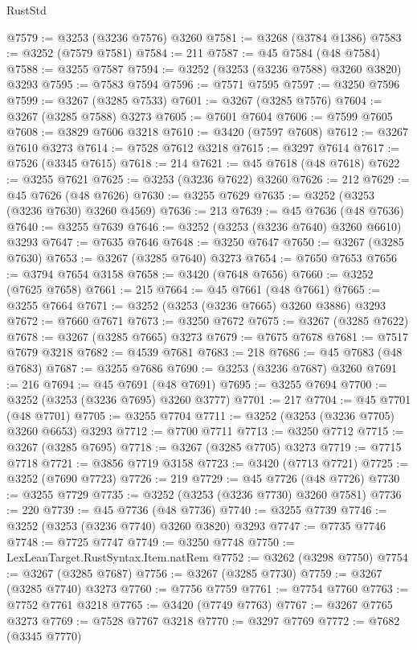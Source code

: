 \begin{lexlean}{RustStd}
\begin{coremodule}
@7579 := @3253 (@3236 @7576) @3260
@7581 := @3268 (@3784 @1386)
@7583 := @3252 (@7579 @7581)
@7584 := 211
@7587 := @45 @7584 (@48 @7584)
@7588 := @3255 @7587
@7594 := @3252 (@3253 (@3236 @7588) @3260 @3820) @3293
@7595 := @7583 @7594
@7596 := @7571 @7595
@7597 := @3250 @7596
@7599 := @3267 (@3285 @7533)
@7601 := @3267 (@3285 @7576)
@7604 := @3267 (@3285 @7588) @3273
@7605 := @7601 @7604
@7606 := @7599 @7605
@7608 := @3829 @7606 @3218
@7610 := @3420 (@7597 @7608)
@7612 := @3267 @7610 @3273
@7614 := @7528 @7612 @3218
@7615 := @3297 @7614
@7617 := @7526 (@3345 @7615)
@7618 := 214
@7621 := @45 @7618 (@48 @7618)
@7622 := @3255 @7621
@7625 := @3253 (@3236 @7622) @3260
@7626 := 212
@7629 := @45 @7626 (@48 @7626)
@7630 := @3255 @7629
@7635 := @3252 (@3253 (@3236 @7630) @3260 @4569)
@7636 := 213
@7639 := @45 @7636 (@48 @7636)
@7640 := @3255 @7639
@7646 := @3252 (@3253 (@3236 @7640) @3260 @6610) @3293
@7647 := @7635 @7646
@7648 := @3250 @7647
@7650 := @3267 (@3285 @7630)
@7653 := @3267 (@3285 @7640) @3273
@7654 := @7650 @7653
@7656 := @3794 @7654 @3158
@7658 := @3420 (@7648 @7656)
@7660 := @3252 (@7625 @7658)
@7661 := 215
@7664 := @45 @7661 (@48 @7661)
@7665 := @3255 @7664
@7671 := @3252 (@3253 (@3236 @7665) @3260 @3886) @3293
@7672 := @7660 @7671
@7673 := @3250 @7672
@7675 := @3267 (@3285 @7622)
@7678 := @3267 (@3285 @7665) @3273
@7679 := @7675 @7678
@7681 := @7517 @7679 @3218
@7682 := @4539 @7681
@7683 := 218
@7686 := @45 @7683 (@48 @7683)
@7687 := @3255 @7686
@7690 := @3253 (@3236 @7687) @3260
@7691 := 216
@7694 := @45 @7691 (@48 @7691)
@7695 := @3255 @7694
@7700 := @3252 (@3253 (@3236 @7695) @3260 @3777)
@7701 := 217
@7704 := @45 @7701 (@48 @7701)
@7705 := @3255 @7704
@7711 := @3252 (@3253 (@3236 @7705) @3260 @6653) @3293
@7712 := @7700 @7711
@7713 := @3250 @7712
@7715 := @3267 (@3285 @7695)
@7718 := @3267 (@3285 @7705) @3273
@7719 := @7715 @7718
@7721 := @3856 @7719 @3158
@7723 := @3420 (@7713 @7721)
@7725 := @3252 (@7690 @7723)
@7726 := 219
@7729 := @45 @7726 (@48 @7726)
@7730 := @3255 @7729
@7735 := @3252 (@3253 (@3236 @7730) @3260 @7581)
@7736 := 220
@7739 := @45 @7736 (@48 @7736)
@7740 := @3255 @7739
@7746 := @3252 (@3253 (@3236 @7740) @3260 @3820) @3293
@7747 := @7735 @7746
@7748 := @7725 @7747
@7749 := @3250 @7748
@7750 := LexLeanTarget.RustSyntax.Item.natRem
@7752 := @3262 (@3298 @7750)
@7754 := @3267 (@3285 @7687)
@7756 := @3267 (@3285 @7730)
@7759 := @3267 (@3285 @7740) @3273
@7760 := @7756 @7759
@7761 := @7754 @7760
@7763 := @7752 @7761 @3218
@7765 := @3420 (@7749 @7763)
@7767 := @3267 @7765 @3273
@7769 := @7528 @7767 @3218
@7770 := @3297 @7769
@7772 := @7682 (@3345 @7770)

\end{coremodule}
\end{lexlean}
